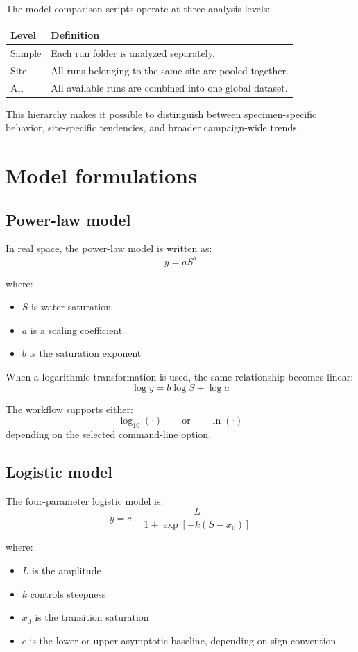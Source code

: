 \documentclass[11pt]{article}
\begin{document}
The model-comparison scripts operate at three analysis levels:
\begin{longtable}{p{} p{}}
\toprule
\textbf{Level} & \textbf{Definition}\\
\midrule
\endhead
Sample & Each run folder is analyzed separately.\\
Site & All runs belonging to the same site are pooled together.\\
All & All available runs are combined into one global dataset.\\
\bottomrule
\end{longtable}

This hierarchy makes it possible to distinguish between specimen-specific behavior, site-specific tendencies, and broader campaign-wide trends.

\section{Model formulations}

\subsection{Power-law model}

In real space, the power-law model is written as:
\[
y = aS^{b}
\]

where:
\begin{itemize}[leftmargin=1.5em]
\item $S$ is water saturation
\item $a$ is a scaling coefficient
\item $b$ is the saturation exponent
\end{itemize}

When a logarithmic transformation is used, the same relationship becomes linear:
\[
\log y = b \log S + \log a
\]

The workflow supports either:
\[
\log_{10}(\cdot)
\qquad \text{or} \qquad
\ln(\cdot)
\]
depending on the selected command-line option.

\subsection{Logistic model}

The four-parameter logistic model is:
\[
y = c + \frac{L}{1 + \exp[-k(S-x_0)]}
\]

where:
\begin{itemize}[leftmargin=1.5em]
\item $L$ is the amplitude
\item $k$ controls steepness
\item $x_0$ is the transition saturation
\item $c$ is the lower or upper asymptotic baseline, depending on sign convention
\end{itemize}
\end{document}
